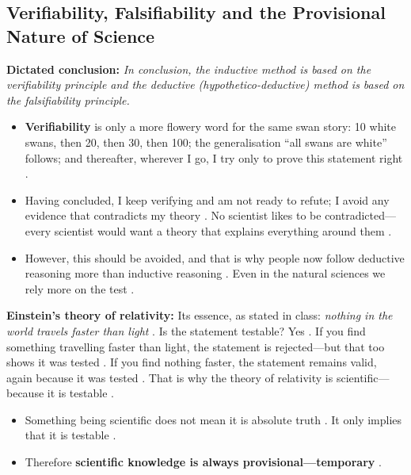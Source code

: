 \subsection{Verifiability, Falsifiability and the Provisional Nature of Science}

\begin{KeyConcept}
\textbf{Dictated conclusion:} \textit{In conclusion, the inductive method is based on the verifiability principle and the deductive (hypothetico-deductive) method is based on the falsifiability principle.} 
\begin{itemize}
    \item \textbf{Verifiability} is only a more flowery word for the same swan story: 10 white swans, then 20, then 30, then 100; the generalisation ``all swans are white'' follows; and thereafter, wherever I go, I try only to prove this statement right .
    \item Having concluded, I keep verifying and am not ready to refute; I avoid any evidence that contradicts my theory . No scientist likes to be contradicted---every scientist would want a theory that explains everything around them .
    \item However, this should be avoided, and that is why people now follow deductive reasoning more than inductive reasoning . Even in the natural sciences we rely more on the test .
\end{itemize}
\end{KeyConcept}

\begin{ExampleBox}
\textbf{Einstein's theory of relativity:} Its essence, as stated in class: \textit{nothing in the world travels faster than light} . Is the statement testable? Yes . If you find something travelling faster than light, the statement is rejected---but that too shows it was tested . If you find nothing faster, the statement remains valid, again because it was tested . That is why the theory of relativity is scientific---because it is testable .
\end{ExampleBox}

\begin{CriticalPoint}
\begin{itemize}
    \item Something being scientific does not mean it is absolute truth . It only implies that it is testable .
    \item Therefore \textbf{scientific knowledge is always provisional---temporary} .
\end{itemize}
\end{CriticalPoint}


